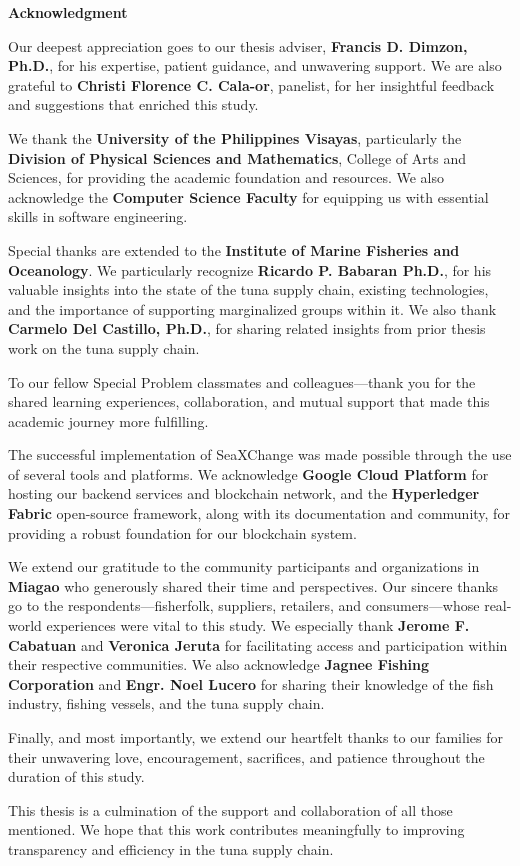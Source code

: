 \begin{center}
	\textbf{Acknowledgment}
\end{center}

Our deepest appreciation goes to our thesis adviser, \textbf{Francis D. Dimzon, Ph.D.}, for his expertise, patient guidance, and unwavering support. We are also grateful to \textbf{Christi Florence C. Cala-or}, panelist, for her insightful feedback and suggestions that enriched this study.

We thank the \textbf{University of the Philippines Visayas}, particularly the \textbf{Division of Physical Sciences and Mathematics}, College of Arts and Sciences, for providing the academic foundation and resources. We also acknowledge the \textbf{Computer Science Faculty} for equipping us with essential skills in software engineering.

Special thanks are extended to the \textbf{Institute of Marine Fisheries and Oceanology}. We particularly recognize \textbf{Ricardo P. Babaran Ph.D.}, for his valuable insights into the state of the tuna supply chain, existing technologies, and the importance of supporting marginalized groups within it. We also thank \textbf{Carmelo Del Castillo, Ph.D.}, for sharing related insights from prior thesis work on the tuna supply chain. 

To our fellow Special Problem classmates and colleagues—thank you for the shared learning experiences, collaboration, and mutual support that made this academic journey more fulfilling.

The successful implementation of SeaXChange was made possible through the use of several tools and platforms. We acknowledge \textbf{Google Cloud Platform} for hosting our backend services and blockchain network, and the \textbf{Hyperledger Fabric} open-source framework, along with its documentation and community, for providing a robust foundation for our blockchain system.

We extend our gratitude to the community participants and organizations in \textbf{Miagao} who generously shared their time and perspectives. Our sincere thanks go to the respondents—fisherfolk, suppliers, retailers, and consumers—whose real-world experiences were vital to this study. We especially thank \textbf{Jerome F. Cabatuan} and \textbf{Veronica Jeruta} for facilitating access and participation within their respective communities. We also acknowledge \textbf{Jagnee Fishing Corporation} and \textbf{Engr. Noel Lucero} for sharing their knowledge of the fish industry, fishing vessels, and the tuna supply chain.

Finally, and most importantly, we extend our heartfelt thanks to our families for their unwavering love, encouragement, sacrifices, and patience throughout the duration of this study.

This thesis is a culmination of the support and collaboration of all those mentioned. We hope that this work contributes meaningfully to improving transparency and efficiency in the tuna supply chain.
